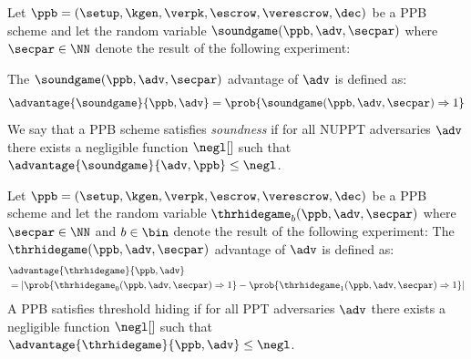 \begin{definition}[Soundness]
	Let $\ppb = (\setup, \kgen, \verpk, \escrow, \verescrow, \dec)$ be a PPB scheme and let the random variable $\soundgame(\ppb, \adv, \secpar)$ where $\secpar \in \NN$ denote the result of the following experiment:

	The $\soundgame(\ppb, \adv, \secpar)$ advantage of $\adv$ is defined as:
	$$
		\advantage{\soundgame}{\ppb, \adv}= \prob{\soundgame(\ppb, \adv, \secpar) \Rightarrow 1}
	$$
	We say that a PPB scheme satisfies \emph{soundness} if for all NUPPT adversaries $\adv$ there exists a negligible function $\negl[]$ such that $\advantage{\soundgame}{\adv, \ppb} \leq \negl$.
\end{definition}

\begin{definition}
	Let $\ppb = (\setup,\allowbreak \kgen,\allowbreak \verpk,\allowbreak \escrow,\allowbreak \verescrow,\allowbreak \dec)$ be a PPB scheme and let the random variable $\thrhidegame_b(\ppb, \adv, \secpar)$ where $\secpar \in \NN$ and $b \in \bin$ denote the result of the following experiment:
	The $\thrhidegame(\ppb, \adv, \secpar)$ advantage of $\adv$ is defined as:
	\begin{align*}
		 & \advantage{\thrhidegame}{\ppb, \adv}                                                                                                \\
		 & = \left|\prob{\thrhidegame_0(\ppb, \adv, \secpar) \Rightarrow 1} - \prob{\thrhidegame_1(\ppb, \adv, \secpar) \Rightarrow 1} \right|
	\end{align*}
	A PPB satisfies threshold hiding if for all PPT adversaries $\adv$ there exists a negligible function $\negl[]$ such that $\advantage{\thrhidegame}{\ppb, \adv} \leq \negl$.
\end{definition}

